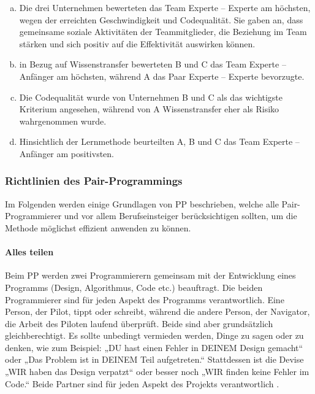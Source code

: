 \begin{enumerate}[a.]

\item Die drei Unternehmen bewerteten das Team Experte – Experte  am höchsten, wegen der erreichten Geschwindigkeit und Codequalität. Sie gaben an, dass gemeinsame soziale Aktivitäten der Teammitglieder, die Beziehung im Team stärken und sich positiv auf die Effektivität auswirken können.
\item in Bezug auf Wissenstransfer bewerteten B und C das Team Experte – Anfänger  am höchsten, während A das Paar Experte – Experte  bevorzugte.
\item Die Codequalität wurde von Unternehmen B und C als das wichtigste Kriterium angesehen, während von A Wissenstransfer eher als Risiko wahrgenommen wurde.
\item Hinsichtlich der Lernmethode beurteilten A, B und C das Team Experte – Anfänger  am positivsten.

\end{enumerate}


\subsubsection *{Richtlinien des Pair-Programmings} Im Folgenden werden einige Grundlagen von PP beschrieben, welche alle Pair-Programmierer und vor allem Berufseinsteiger berücksichtigen sollten, um die Methode möglichst effizient anwenden zu können.


\paragraph{ Alles teilen} Beim PP werden zwei Programmierern gemeinsam mit der Entwicklung eines Programms (Design, Algorithmus, Code etc.) beauftragt. Die beiden Programmierer sind für jeden Aspekt des Programms verantwortlich. Eine Person, der Pilot, tippt oder schreibt, während die andere Person, der Navigator, die Arbeit des Piloten laufend überprüft. Beide sind aber grundsätzlich gleichberechtigt. Es sollte unbedingt vermieden werden, Dinge zu sagen oder zu denken, wie zum Beispiel: „DU hast einen Fehler in DEINEM Design gemacht“ oder „Das Problem ist in DEINEM Teil aufgetreten.“ Stattdessen ist die Devise „WIR haben das Design verpatzt“ oder besser noch „WIR finden keine Fehler im Code.“ Beide Partner sind für jeden Aspekt des Projekts verantwortlich \cite{Williams2000AllKindergarten}.

